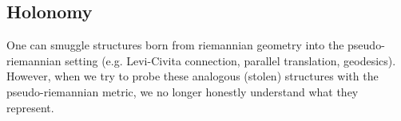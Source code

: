 \documentclass[12pt]{amsart}
\theoremstyle{definition}
\theoremstyle{remark}
\newcommand{\bR}{\mathbb{R}}
\begin{document}














         

\subsection{Holonomy}

One can smuggle structures born from riemannian geometry into the pseudo-riemannian setting (e.g. Levi-Civita connection, parallel translation, geodesics). However, when we try to probe these analogous (stolen) structures with the pseudo-riemannian metric, we no longer honestly understand what they represent. 
\end{document}
